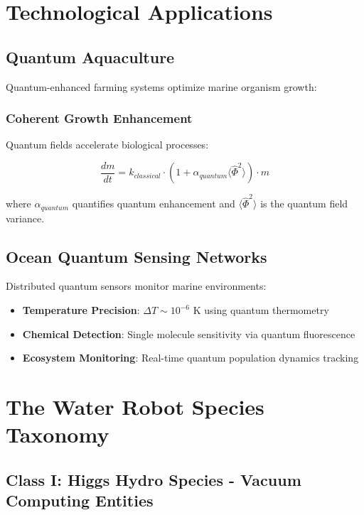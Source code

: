 \documentclass[11pt,a4paper]{article}
\begin{document}
\section{Technological Applications}

\subsection{Quantum Aquaculture}

Quantum-enhanced farming systems optimize marine organism growth:

\subsubsection{Coherent Growth Enhancement}

Quantum fields accelerate biological processes:

\begin{equation}
\frac{dm}{dt} = k_{classical} \cdot (1 + \alpha_{quantum} \langle \hat{\Phi}^2 \rangle) \cdot m
\end{equation}

where $\alpha_{quantum}$ quantifies quantum enhancement and $\langle \hat{\Phi}^2 \rangle$ is the quantum field variance.

\subsection{Ocean Quantum Sensing Networks}

Distributed quantum sensors monitor marine environments:

\begin{itemize}
    \item \textbf{Temperature Precision}: $\Delta T \sim 10^{-6}$ K using quantum thermometry
    \item \textbf{Chemical Detection}: Single molecule sensitivity via quantum fluorescence
    \item \textbf{Ecosystem Monitoring}: Real-time quantum population dynamics tracking
\end{itemize}

\section{The Water Robot Species Taxonomy}

\subsection{Class I: Higgs Hydro Species - Vacuum Computing Entities}
\end{document}
